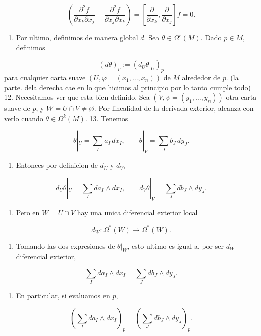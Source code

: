 \begin{bookproof}{}
\[
\left(\frac{\partial^2 f}{\partial x_k\partial x_j}-\frac{\partial^2 f}{\partial x_j\partial x_k}\right)=\left[\frac{\partial }{\partial x_k},\frac{\partial}{\partial x_j}\right]f=0.
\]
\begin{enumerate}[start=11]
\item Por ultimo, definimos de manera global $d$. Sea $\theta\in\Omega^r(M)$. Dado $p\in M$, definimos
\end{enumerate}
\[
(d\theta)_p:=(d_U\theta|_U)_p
\]
para cualquier carta suave $(U,\varphi=(x_1,\ldots,x_n))$ de $M$ alrededor de $p$. (la parte. dela derecha cae en lo que hicimos al principio por lo tanto cumple todo) 12. Necesitamos ver que esta bien definido. Sea $(V,\psi=(y_1,\ldots,y_n))$ otra carta suave de $p$, y $W=U\cap V\ne\varnothing$. Por linealidad de la derivada exterior, alcanza con verlo cuando $\theta\in\Omega^k(M)$. 13. Tenemos

\[
\theta|_U=\sum_Ia_I\,dx_I,\qquad \theta|_V=\sum_Jb_J\,dy_J.
\]
\begin{enumerate}[start=14]
\item Entonces por definicion de $d_U$ y $d_V$,
\end{enumerate}
\[
d_U\theta|_U=\sum_Ida_I\wedge dx_I,\qquad d_V\theta|_V=\sum_Jdb_J\wedge dy_J.
\]
\begin{enumerate}[start=15]
\item Pero en $W=U\cap V$ hay una unica diferencial exterior local
\end{enumerate}
\[
d_W:\Omega^*(W)\to\Omega^{*}(W).
\]
\begin{enumerate}[start=16]
\item Tomando las dos expresiones de $\theta|_W$, esto ultimo es igual a, por ser $d_W$ diferencial exterior,
\end{enumerate}
\[
\sum_Ida_I\wedge dx_I=\sum_Jdb_J\wedge dy_J.
\]
\begin{enumerate}[start=17]
\item En particular, si evaluamos en $p$,
\end{enumerate}
\[
(\sum_Ida_I\wedge dx_I)_p=(\sum_Jdb_J\wedge dy_J)_p.
\]
\bookqed
\end{bookproof}
\label{blk:f7b034}

